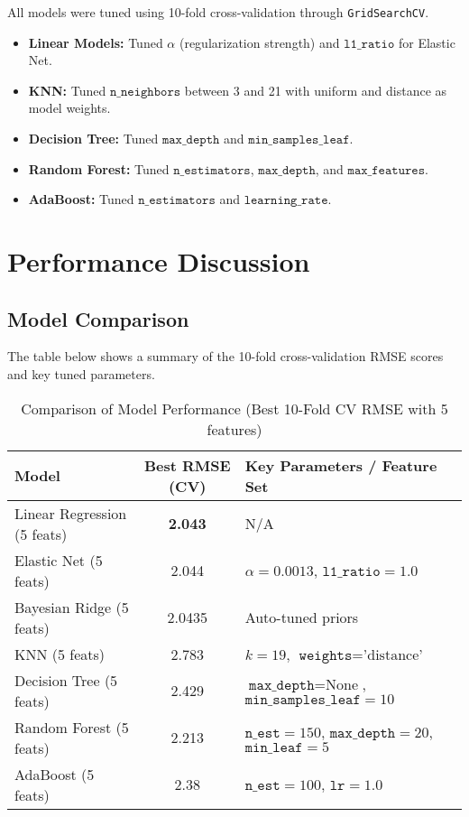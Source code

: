 \documentclass[12pt,a4paper]{article}
\begin{document}
All models were tuned using 10-fold cross-validation through \texttt{GridSearchCV}.  

\begin{itemize}
    \item \textbf{Linear Models:} Tuned $\alpha$ (regularization strength) and $\texttt{l1\_ratio}$ for Elastic Net.
    \item \textbf{KNN:} Tuned $\texttt{n\_neighbors}$ between 3 and 21 with uniform and distance as model weights.
    \item \textbf{Decision Tree:} Tuned $\texttt{max\_depth}$ and $\texttt{min\_samples\_leaf}$.
    \item \textbf{Random Forest:} Tuned $\texttt{n\_estimators}$, $\texttt{max\_depth}$, and $\texttt{max\_features}$.
    \item \textbf{AdaBoost:} Tuned $\texttt{n\_estimators}$ and $\texttt{learning\_rate}$.
\end{itemize}

\section{Performance Discussion}

\subsection{Model Comparison}
The table below shows a summary of the 10-fold cross-validation RMSE scores and key tuned parameters.

\begin{table}[htbp] %
\centering
\caption{Comparison of Model Performance (Best 10-Fold CV RMSE with 5 features)}
\label{tab:model_comparison} %
\begin{tabular}{l c l}
\toprule
\textbf{Model} & \textbf{Best RMSE (CV)} & \textbf{Key Parameters / Feature Set} \\
\midrule
Linear Regression (5 feats) & \textbf{2.043} & N/A \\
Elastic Net (5 feats) & 2.044 & $\alpha = 0.0013$, $\texttt{l1\_ratio} = 1.0$ \\
Bayesian Ridge (5 feats) & 2.0435 & Auto-tuned priors \\
KNN (5 feats) & 2.783 & $k = 19$, $\texttt{weights} = \text{'distance'}$ \\
Decision Tree (5 feats) & 2.429 & $\texttt{max\_depth}=\text{None}$, $\texttt{min\_samples\_leaf}=10$ \\
Random Forest (5 feats) & 2.213 & $\texttt{n\_est}=150$, $\texttt{max\_depth}=20$, $\texttt{min\_leaf}=5$ \\ 
AdaBoost (5 feats) & 2.38 & $\texttt{n\_est}=100$, $\texttt{lr}=1.0$ \\ 
\bottomrule
\end{tabular}
\end{table}
\end{document}
